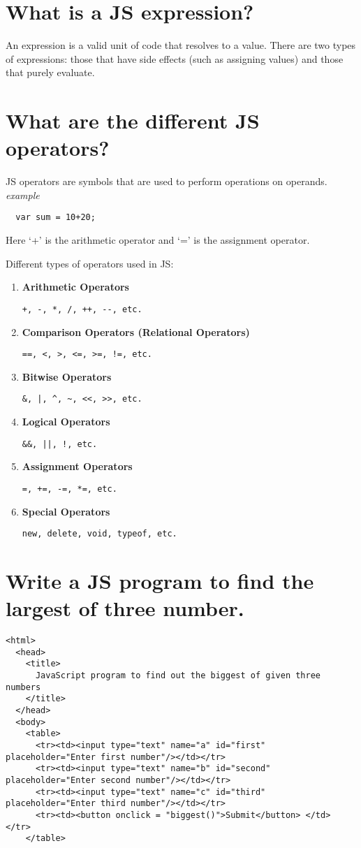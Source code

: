 \documentclass[14pt]{article}
\begin{document}
{\section{What is a JS  expression?}
An expression is a valid unit of code that resolves to a value. There are two types of expressions: those that have side effects (such as assigning values) and those that purely evaluate.
\section{What are the different JS operators?}
JS operators are symbols that are used to perform operations on operands.
\textit{example}
\begin{verbatim}
  var sum = 10+20;
\end{verbatim}
Here `+' is the arithmetic operator and `=' is the assignment operator.

Different types of operators used in JS:
\begin{enumerate}
  \item \textbf{Arithmetic Operators}

    \verb|+, -, *, /, ++, --, etc.|

  \item \textbf{Comparison Operators (Relational Operators)}

    \verb|==, <, >, <=, >=, !=, etc.|

  \item \textbf{Bitwise Operators}

    \verb+&, |, ^, ~, <<, >>, etc.+

  \item \textbf{Logical Operators}

    \verb+&&, ||, !, etc.+

  \item \textbf{Assignment Operators}

    \verb|=, +=, -=, *=, etc.|

  \item \textbf{Special Operators}

    \verb|new, delete, void, typeof, etc.|
\end{enumerate}
\section{Write a JS program to find the largest of three number.}
\begin{lstlisting}
<html>
  <head>
    <title>
      JavaScript program to find out the biggest of given three numbers
    </title>
  </head>
  <body>
    <table>
      <tr><td><input type="text" name="a" id="first" placeholder="Enter first number"/></td></tr>
      <tr><td><input type="text" name="b" id="second" placeholder="Enter second number"/></td></tr>
      <tr><td><input type="text" name="c" id="third" placeholder="Enter third number"/></td></tr>
      <tr><td><button onclick = "biggest()">Submit</button> </td> </tr>
    </table>
    

\end{lstlisting}}
\end{document}
